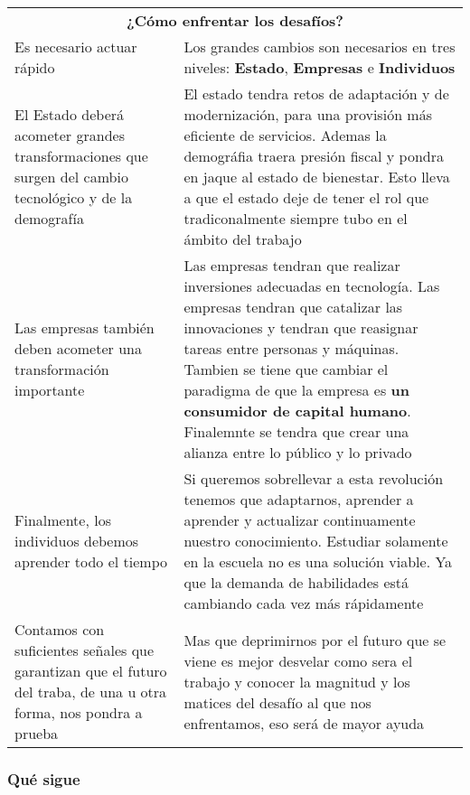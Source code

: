 \begingroup
\setlength{\tabcolsep}{12pt} %
\renewcommand{\arraystretch}{1.5} %
\begin{tabular}{p{4cm}|p{11cm}}
\multicolumn{2}{c}{\large \bf ¿Cómo enfrentar los desafíos?}\\
Es necesario actuar rápido&Los grandes cambios son necesarios en tres niveles: {\bf Estado}, {\bf Empresas} e {\bf Individuos}\\
El Estado deberá acometer grandes transformaciones que surgen del cambio tecnológico y de la demografía&El estado tendra retos de adaptación y de modernización, para una provisión más eficiente de servicios. Ademas la demográfia traera presión fiscal y pondra en jaque al estado de bienestar. Esto lleva a que el estado deje de tener el rol que tradiconalmente siempre tubo en el ámbito del trabajo\\
Las empresas también deben acometer una transformación importante&Las empresas tendran que realizar inversiones adecuadas en tecnología. Las empresas tendran que catalizar las innovaciones y tendran que reasignar tareas entre personas y máquinas. Tambien se tiene que cambiar el paradigma de que la empresa es {\bf un consumidor de capital humano}. Finalemnte se tendra que crear una alianza entre lo público y lo privado\\
Finalmente, los individuos debemos aprender todo el tiempo&Si queremos sobrellevar a esta revolución tenemos que adaptarnos,  aprender a aprender y actualizar continuamente nuestro conocimiento. Estudiar solamente en la escuela no es una solución viable. Ya que la demanda de habilidades está cambiando cada vez más rápidamente \\
Contamos con suficientes señales que garantizan que el futuro del traba, de una u otra forma, nos pondra a prueba& Mas que deprimirnos por el futuro que se viene es mejor desvelar como sera el trabajo y conocer la magnitud y los matices del desafío al que nos enfrentamos, eso será de mayor ayuda\\
\end{tabular}
\endgroup

\subsubsection{Qué sigue}